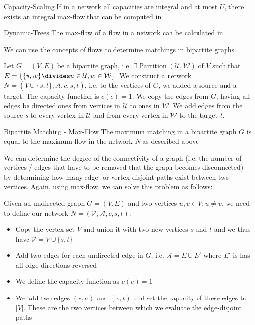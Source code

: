 \begin{proposition}[]{Capacity-Scaling}
    If in a network all capacities are integral and at most $U$, there exists an integral max-flow that can be computed in 
\end{proposition}

\begin{proposition}[]{Dynamic-Trees}
    The max-flow of a flow in a network can be calculated in 
\end{proposition}


\newpage
{}

We can use the concepts of flows to determine matchings in bipartite graphs.

Let $G = (V, E)$ be a bipartite graph, i.e. $\exists$ Partition $(\mathcal{U}, \mathcal{W})$ of $V$ such that $E = \{\{u, w\} \divides u \in \mathcal{U}, w \in \mathcal{W}\}$.
We construct a network $N = (V \dot{\cup} \{s, t\}, \mathcal{A}, c, s, t)$, i.e. to the vertices of $G$, we added a source and a target.
The capacity function is $c(e) = 1$.
We copy the edges from $G$, having all edges be directed ones from vertices in $\mathcal{U}$ to ones in $\mathcal{W}$.
We add edges from the source $s$ to every vertex in $\mathcal{U}$ and from every vertex in $\mathcal{W}$ to the target $t$.

\begin{lemma}[]{Bipartite Matching - Max-Flow}
    The maximum matching in a bipartite graph $G$ is equal to the maximum flow in the network $N$ as described above
\end{lemma}



We can determine the degree of the connectivity of a graph (i.e. the number of vertices / edges that have to be removed that the graph becomes disconnected) by determining how many edge- or vertex-disjoint paths exist between two vertices.
Again, using max-flow, we can solve this problem as follows:

Given an undirected graph $G = (V, E)$ and two vertices $u, v \in V : u \neq v$, we need to define our network $N = (\mathcal{V}, \mathcal{A}, c, s, t)$:
\begin{itemize}
    \item Copy the vertex set $V$ and union it with two new vertices $s$ and $t$ and we thus have $\mathcal{V} = V \cup \{s, t\}$
    \item Add two edges for each undirected edge in $G$, i.e. $\mathcal{A} = E \cup E'$ where $E'$ is has all edge directions reversed
    \item We define the capacity function as $c(e) = 1$
    \item We add two edges $(s, u)$ and $(v, t)$ and set the capacity of these edges to $|V|$. These are the two vertices between which we evaluate the edge-disjoint paths
\end{itemize}

